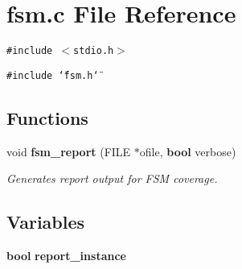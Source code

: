 \section{fsm.c File Reference}
\label{fsm_8c}
{\tt \#include $<$stdio.h$>$}\par
{\tt \#include \char`\"{}fsm.h\char`\"{}}\par
\subsection*{Functions}
\begin{CompactItemize}
\item 
void {\bf fsm\_\-report} (FILE $\ast$ofile, {\bf bool} verbose)
\begin{CompactList}\small\item\em Generates report output for FSM coverage.\item\end{CompactList}\end{CompactItemize}
\subsection*{Variables}
\begin{CompactItemize}
\item 
{\bf bool} {\bf report\_\-instance}
\end{CompactItemize}


